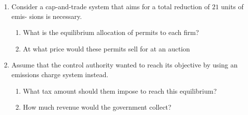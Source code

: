 \documentclass[11pt]{article}
\begin{document}
\begin{enumerate}
  \begin{enumerate}
    \item Consider a cap-and-trade system that aims for a total reduction of $21$ units of emis-
    sions is necessary. 
    \begin{enumerate}
      \item What is the equilibrium allocation of permits to each firm?
      \item At what price would these permits sell for at an auction
    \end{enumerate}

    \item Assume that the control authority wanted to reach its objective by using an emissions
    charge system instead.
    \begin{enumerate}
      \item What tax amount should them impose to reach this equilibrium?
      \item How much revenue would the government collect?
    \end{enumerate}
  \end{enumerate}
\end{enumerate}
\end{document}
